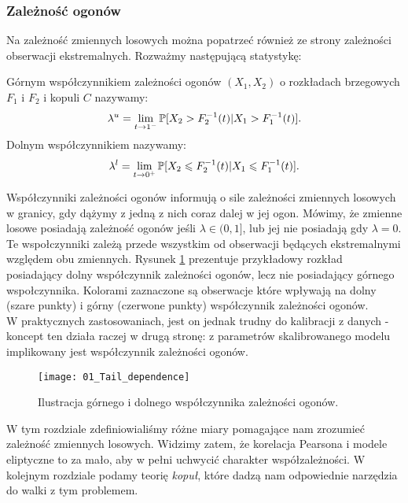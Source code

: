 \subsubsection{Zależność ogonów}
Na zależność zmiennych losowych można popatrzeć również ze strony zależności obserwacji ekstremalnych. Rozważmy następującą statystykę:

\begin{df}
	Górnym współczynnikiem zależności ogonów $(X_1, X_2)$ o rozkładach brzegowych $F_1$ i $F_2$ i kopuli $C$ nazywamy:
	$$ \lambda^{u} = \lim\limits_{t\to1^{-}}\mathbb{P}[X_2 > F_2^{-1}(t) \vert X_1 > F_1^{-1}(t) ].$$
	Dolnym współczynnikiem nazywamy:
	$$ \lambda^{l} = \lim\limits_{t\to0^{+}}\mathbb{P}[X_2 \leqslant F_2^{-1}(t) \vert X_1 \leqslant F_1^{-1}(t) ].$$
\end{df}

Współczynniki zależności ogonów informują o sile zależności zmiennych losowych w granicy, gdy dążymy z jedną z nich coraz dalej w jej ogon. Mówimy, że zmienne losowe posiadają zależność ogonów jeśli $\lambda \in (0, 1]$, lub jej nie posiadają gdy $\lambda =0$. Te wspołczynniki zależą przede wszystkim od obserwacji będących ekstremalnymi względem obu zmiennych. Rysunek \ref{fig:tail_dependence} prezentuje przykładowy rozkład posiadający dolny współczynnik zależności ogonów, lecz nie posiadający górnego wspołczynnika. Kolorami zaznaczone są obserwacje które wpływają na dolny (szare punkty) i górny (czerwone punkty) współczynnik zależności ogonów.\\
W praktycznych zastosowaniach, jest on jednak trudny do kalibracji z danych - koncept ten działa raczej w drugą stronę: z parametrów skalibrowanego modelu implikowany jest współczynnik zależności ogonów.
\begin{figure}[H]
	\centering
	\texttt{[image: 01\_Tail\_dependence]}	
	\caption{Ilustracja górnego i dolnego współczynnika zależności ogonów.\label{fig:tail_dependence}}
\end{figure}

W tym rozdziale zdefiniowialiśmy różne miary pomagające nam zrozumieć zależność zmiennych losowych. Widzimy zatem, że korelacja Pearsona i modele eliptyczne to za mało, aby w pełni uchwycić charakter współzależności. W kolejnym rozdziale podamy teorię \emph{kopuł}, które dadzą nam odpowiednie narzędzia do walki z tym problemem.